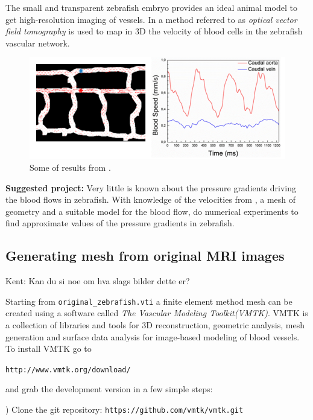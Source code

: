 \documentclass[epsfig,11pt]{article}
\begin{document}
The small and transparent zebrafish embryo provides an ideal animal model to get high-resolution imaging of vessels. In \cite{fieramonti2015quantitative} a method referred to as \emph{optical vector field tomography} is used to map in 3D the velocity of blood cells in the zebrafish vascular network. 

\begin{figure}[h!] 
\begin{center}
  \includegraphics[scale=0.5]{blood_velocities.png}
  \end{center}
  \caption{Some of results from \cite{fieramonti2015quantitative}.}
\end{figure}

\textbf{Suggested project:} Very little is known about the pressure gradients driving the blood flows in zebrafish. With knowledge of the velocities from \cite{fieramonti2015quantitative}, a mesh of geometry and a suitable model for the blood flow, do numerical experiments to find approximate values of the pressure gradients in zebrafish.

\subsection{Generating mesh from original MRI images}

{\color{red} Kent: Kan du si noe om hva slags bilder dette er?}

Starting from \texttt{original\_zebrafish.vti} a finite element method mesh can be created using a software called \emph{The Vascular Modeling Toolkit(VMTK)}. VMTK is a collection of libraries and tools for 3D reconstruction, geometric analysis, mesh generation and surface data analysis for image-based modeling of blood vessels. To install VMTK go to 

\texttt{http://www.vmtk.org/download/}

and grab the development version in a few simple steps:

) Clone the git repository: \texttt{https://github.com/vmtk/vmtk.git}
\end{document}
